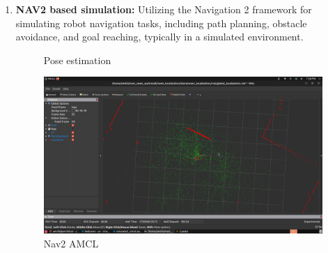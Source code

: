{\begin{enumerate}[label=\textbf{\arabic*}., leftmargin=*]
		
		\item \textbf{NAV2 based simulation:} Utilizing the Navigation 2 framework for simulating robot
		navigation tasks, including path planning, obstacle avoidance, and goal reaching, typically
		in a simulated environment.
		
		\begin{figure}[H]
			\centering
			\hfill
			\hfill
			\caption{Pose estimation}
			\label{fig:posestim}
		\end{figure}
		
		\begin{figure}[H]
			\centering
			\includegraphics[scale=0.15]{images/Content/Nav2_AMCL}
			\caption{Nav2 AMCL}
			\label{fig:nav2amcl}
		\end{figure}
		

\end{enumerate}}
